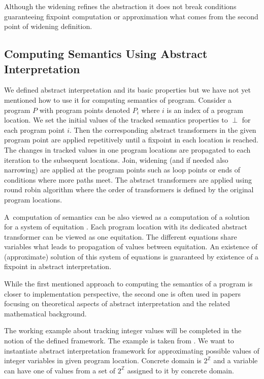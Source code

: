 \documentclass[a4paper, 12pt]{article}
\newcommand{\ainf}[0]{\perp}
\newcommand{\intg}[0]{\mathbb{Z}}
\begin{document}
Although the widening refines the abstraction it does not
break conditions guaranteeing fixpoint computation or approximation
what comes from the second point of widening definition.

\subsection{Computing Semantics Using Abstract Interpretation}

We defined abstract interpretation and its basic properties
but we have not yet mentioned how to use it for computing
semantics of program.
Consider a program $P$ with program points denoted $P_i$
where $i$ is an index of a program location.
We set the initial values of the tracked semantics properties
to $\ainf$ for each program point $i$.
Then the corresponding abstract transformers in the given program point
are applied repetitively until a fixpoint in each location is reached.
The changes in tracked values in one program locations are propagated to each
iteration to the subsequent locations.
Join, widening (and if needed also narrowing) are applied at the program points
such as loop points or ends of conditions where more paths meet.
The abstract transformers are applied using round robin algorithm where
the order of transformers is defined by the original program locations.

A~computation of semantics can be also viewed as a computation of
a solution for a system of equitation \cite{cousot81}.
Each program location with its dedicated abstract transformer can be viewed
as one equitation.
The different equations share variables what leads to propagation
of values between equitation.
An existence of (approximate) solution of this system of equations
is guaranteed by existence of a fixpoint in abstract interpretation.

While the first mentioned approach to computing the semantics of a program is
closer to implementation perspective, the second one is often used in papers
focusing on theoretical aspects of abstract interpretation and
the related mathematical background.

\bexmp
The working example about tracking integer values will be completed
in the notion of the defined framework.
The example is taken from \cite{popl77}.
We want to instantiate abstract interpretation framework for approximating
possible values of integer variables in given program location.
Concrete domain is $2^\mathbb{\intg}$ and a variable can have one of values
from a set of $2^\mathbb{\intg}$ assigned to it by concrete domain.
\end{document}
